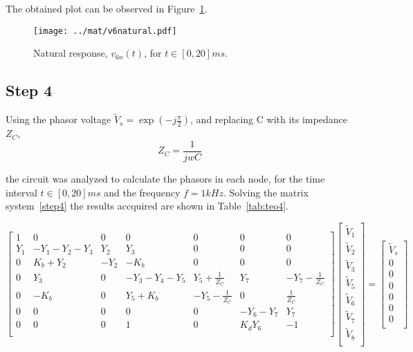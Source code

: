 The obtained plot can be observed in Figure~\ref{fig:v6n}.

\begin{figure}[ht!]
  \centering
  \texttt{[image: ../mat/v6natural.pdf]}
  \caption{Natural response, $v_{6n}(t)$, for $t\in [0,20]ms$.}
  \label{fig:v6n}
\end{figure}
\FloatBarrier





\vspace{-12pt}
\subsection{Step 4}
Using the phasor voltage $\tilde{V}_s=\exp{(-j\frac{\pi}{2})}$, and replacing C with its impedance $Z_C$,
\begin{equation}
    Z_C=\frac{1}{jwC}
    \label{Zc}
\end{equation}

\noindent the circuit was analyzed to calculate the phasors in each node, for the time interval $t\in [0,20]ms$ and the frequency $f=1kHz$.
Solving the matrix system~\ref{step4} the results accquired are shown in Table~\ref{tab:teo4}.

\begin{equation}\label{step4}
  \begin{bmatrix}
    1 & 0 & 0 & 0 & 0 & 0 & 0 \\
    Y_1 & -Y_1-Y_2-Y_3 & Y_2 & Y_3 & 0 & 0 & 0 \\
    0 & K_b+Y_2 & -Y_2 & -K_b & 0 & 0 & 0 \\
    0 & Y_3 & 0 & -Y_3-Y_4-Y_5 & Y_5+\frac{1}{Z_C} & Y_7 & -Y_7-\frac{1}{Z_C} \\
    0 & -K_b & 0 & Y_5+K_b & -Y_5-\frac{1}{Z_C} & 0 & \frac{1}{Z_C} \\
    0 & 0 & 0 & 0 & 0 & -Y_6-Y_7 & Y_7\\
    0 & 0 & 0 & 1 & 0 & K_dY_6 & -1\\
  \end{bmatrix}
  \begin{bmatrix}
    \tilde{V}_1\\
    \tilde{V}_2\\
    \tilde{V}_3\\
    \tilde{V}_5\\
    \tilde{V}_6\\
    \tilde{V}_7\\
    \tilde{V}_8\\
  \end{bmatrix}
  =
  \begin{bmatrix}
    \tilde{V}_{s}\\
    0\\
    0\\
    0\\
    0\\
    0\\
    0\\
  \end{bmatrix}
\end{equation}

